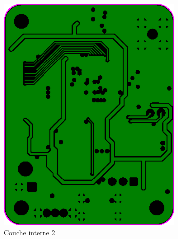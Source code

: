 \documentclass{article}
\begin{document}
\begin{figure}[h!]
\begin{subfigure}{0.40\textwidth}
        \includegraphics[width=\textwidth]{image/Inner2.png}
        \caption{Couche interne 2}
        \label{fig:apex_inner2}
    \end{subfigure}
    \begin{subfigure}{0.40\textwidth}
        \centering

\end{subfigure}
\end{figure}
\end{document}
